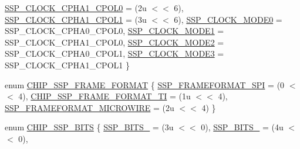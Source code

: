 \begin{DoxyCompactItemize}
\hyperlink{group___s_s_p__18_x_x__43_x_x_ggab423240914ad746147aeb31f483e9553ae85026628900cd0603aea8741196e37c}{S\+S\+P\+\_\+\+C\+L\+O\+C\+K\+\_\+\+C\+P\+H\+A1\+\_\+\+C\+P\+O\+L0} = (2u $<$$<$ 6), 
\hyperlink{group___s_s_p__18_x_x__43_x_x_ggab423240914ad746147aeb31f483e9553ab45a1654a40d69da708a2fd3717b3b3f}{S\+S\+P\+\_\+\+C\+L\+O\+C\+K\+\_\+\+C\+P\+H\+A1\+\_\+\+C\+P\+O\+L1} = (3u $<$$<$ 6), 
\newline
\hyperlink{group___s_s_p__18_x_x__43_x_x_ggab423240914ad746147aeb31f483e9553a356a1e930e648bee4fdcf58bbf2be871}{S\+S\+P\+\_\+\+C\+L\+O\+C\+K\+\_\+\+M\+O\+D\+E0} = S\+S\+P\+\_\+\+C\+L\+O\+C\+K\+\_\+\+C\+P\+H\+A0\+\_\+\+C\+P\+O\+L0, 
\hyperlink{group___s_s_p__18_x_x__43_x_x_ggab423240914ad746147aeb31f483e9553a9c0ef0c2b54bd1f7cd915c072bb90c4f}{S\+S\+P\+\_\+\+C\+L\+O\+C\+K\+\_\+\+M\+O\+D\+E1} = S\+S\+P\+\_\+\+C\+L\+O\+C\+K\+\_\+\+C\+P\+H\+A1\+\_\+\+C\+P\+O\+L0, 
\hyperlink{group___s_s_p__18_x_x__43_x_x_ggab423240914ad746147aeb31f483e9553a0ead0c9201c4f3ed09b8d8395b15e38d}{S\+S\+P\+\_\+\+C\+L\+O\+C\+K\+\_\+\+M\+O\+D\+E2} = S\+S\+P\+\_\+\+C\+L\+O\+C\+K\+\_\+\+C\+P\+H\+A0\+\_\+\+C\+P\+O\+L1, 
\hyperlink{group___s_s_p__18_x_x__43_x_x_ggab423240914ad746147aeb31f483e9553a509d039d8fa85d04307fa845b5f96ef0}{S\+S\+P\+\_\+\+C\+L\+O\+C\+K\+\_\+\+M\+O\+D\+E3} = S\+S\+P\+\_\+\+C\+L\+O\+C\+K\+\_\+\+C\+P\+H\+A1\+\_\+\+C\+P\+O\+L1
 \}
\item 
enum \hyperlink{group___s_s_p__18_x_x__43_x_x_gad3ae555ad43caa2b2a47bc4769d8fe50}{C\+H\+I\+P\+\_\+\+S\+S\+P\+\_\+\+F\+R\+A\+M\+E\+\_\+\+F\+O\+R\+M\+AT} \{ \hyperlink{group___s_s_p__18_x_x__43_x_x_ggad3ae555ad43caa2b2a47bc4769d8fe50a04830722a3c3c26165b6e86944f80799}{S\+S\+P\+\_\+\+F\+R\+A\+M\+E\+F\+O\+R\+M\+A\+T\+\_\+\+S\+PI} = (0 $<$$<$ 4), 
\hyperlink{group___s_s_p__18_x_x__43_x_x_ggad3ae555ad43caa2b2a47bc4769d8fe50a958fc5c359dea48d02188bebb93f3fd2}{C\+H\+I\+P\+\_\+\+S\+S\+P\+\_\+\+F\+R\+A\+M\+E\+\_\+\+F\+O\+R\+M\+A\+T\+\_\+\+TI} = (1u $<$$<$ 4), 
\hyperlink{group___s_s_p__18_x_x__43_x_x_ggad3ae555ad43caa2b2a47bc4769d8fe50a44c2cf7ad92d503bb0e32fa644b847d4}{S\+S\+P\+\_\+\+F\+R\+A\+M\+E\+F\+O\+R\+M\+A\+T\+\_\+\+M\+I\+C\+R\+O\+W\+I\+RE} = (2u $<$$<$ 4)
 \}
\item 
enum \hyperlink{group___s_s_p__18_x_x__43_x_x_ga2f99e08511788c146ae9b35023e4a61c}{C\+H\+I\+P\+\_\+\+S\+S\+P\+\_\+\+B\+I\+TS} \{ \newline
\hyperlink{group___s_s_p__18_x_x__43_x_x_gga2f99e08511788c146ae9b35023e4a61caa03e3d7c54b1b7e0a1159819be0fe2f4}{S\+S\+P\+\_\+\+B\+I\+T\+S\+\_} = (3u $<$$<$ 0), 
\hyperlink{group___s_s_p__18_x_x__43_x_x_gga2f99e08511788c146ae9b35023e4a61cad68718bef531b459a981f3fe333885af}{S\+S\+P\+\_\+\+B\+I\+T\+S\+\_} = (4u $<$$<$ 0), 
$$
\end{DoxyCompactItemize}
